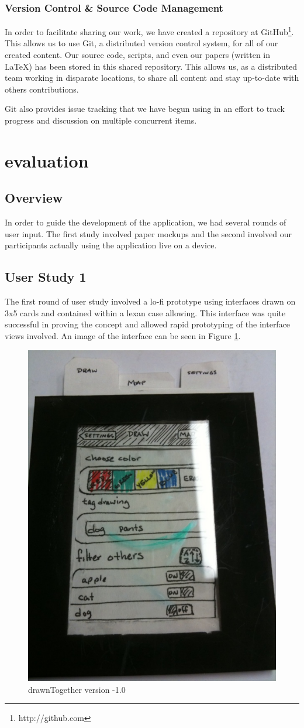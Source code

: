 \documentclass{chi2009}
\begin{document}
\subsubsection{Version Control \& Source Code Management}

In order to facilitate sharing our work, we have created a repository at
GitHub\footnote{http://github.com}.  This allows us to use Git, a distributed
version control system, for all of our created content.  Our source code,
scripts, and even our papers (written in \LaTeX) has been stored in this shared
repository.  This allows us, as a distributed team working in disparate
locations, to share all content and stay up-to-date with others contributions.

Git also provides issue tracking that we have begun using in an effort to track
progress and discussion on multiple concurrent items.

\section{evaluation}

\subsection{Overview}
In order to guide the development of the application, we had several rounds of
user input.  The first study involved paper mockups and the second involved our
participants actually using the application live on a device.

\subsection{User Study 1}

The first round of user study involved a lo-fi prototype using interfaces drawn
on 3x5 cards and contained within a lexan case allowing.  This interface was
quite successful in proving the concept and allowed rapid prototyping of the
interface views involved.  An image of the interface can be seen in Figure
\ref{fig:plastic}.

\begin{figure}
\centering
\includegraphics[width=.40\textwidth]{plastic.pdf}
\caption{drawnTogether version -1.0} \label{fig:plastic}
\end{figure}
\end{document}
